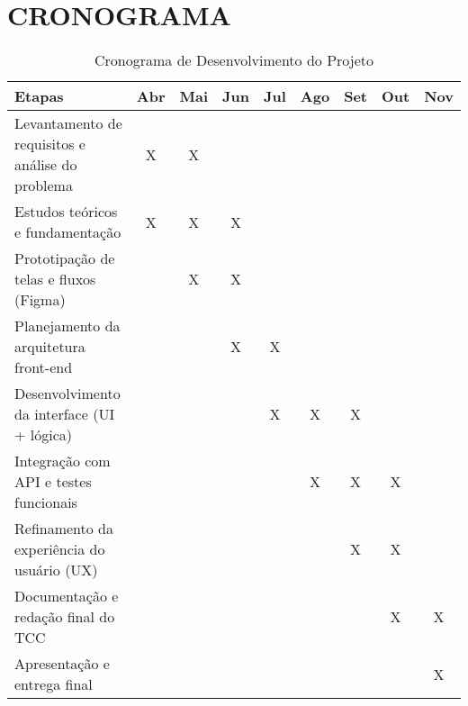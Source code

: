 \chapter{CRONOGRAMA}

\begin{table}[H]
\centering
\caption{Cronograma de Desenvolvimento do Projeto}
\begin{tabular}{|p{7cm}|c|c|c|c|c|c|c|c|}
\hline
\textbf{Etapas} & \textbf{Abr} & \textbf{Mai} & \textbf{Jun} & \textbf{Jul} & \textbf{Ago} & \textbf{Set} & \textbf{Out} & \textbf{Nov} \\
\hline
Levantamento de requisitos e análise do problema & X & X &   &   &   &   &   &   \\
\hline
Estudos teóricos e fundamentação & X & X & X &   &   &   &   &   \\
\hline
Prototipação de telas e fluxos (Figma) &   & X & X &   &   &   &   &   \\
\hline
Planejamento da arquitetura front-end &   &   & X & X &   &   &   &   \\
\hline
Desenvolvimento da interface (UI + lógica) &   &   &   & X & X & X &   &   \\
\hline
Integração com API e testes funcionais &   &   &   &   & X & X & X &   \\
\hline
Refinamento da experiência do usuário (UX) &   &   &   &   &   & X & X &   \\
\hline
Documentação e redação final do TCC &   &   &   &   &   &   & X & X \\
\hline
Apresentação e entrega final &   &   &   &   &   &   &   & X \\
\hline
\end{tabular}
\label{tab:cronograma}
\end{table}
